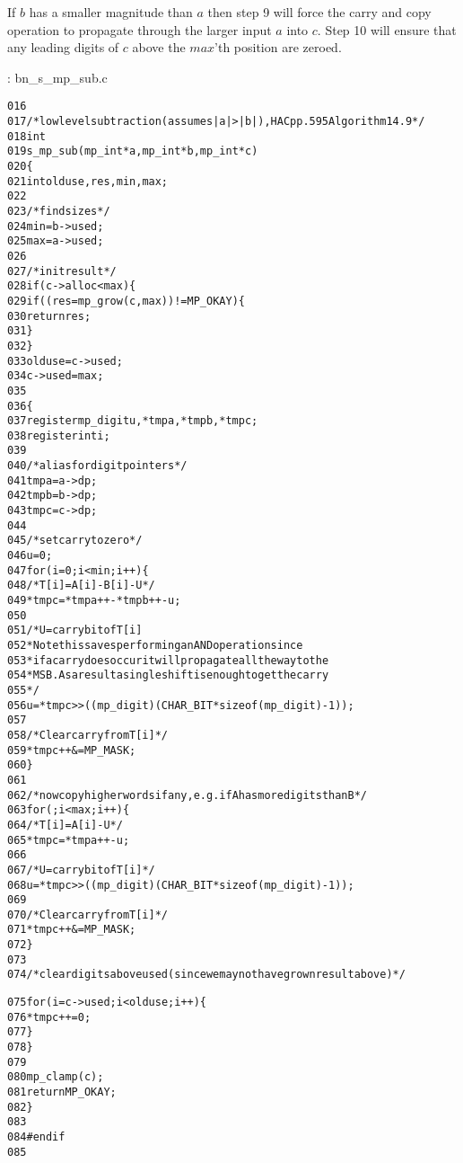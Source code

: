 \documentclass[b5paper]{book}
\begin{document}
If $b$ has a smaller magnitude than $a$ then step 9 will force the carry and copy operation to propagate through the larger input $a$ into $c$.  Step
10 will ensure that any leading digits of $c$ above the $max$'th position are zeroed.

\vspace{+3mm}\begin{small}
\hspace{-5.1mm}{\bf File}: bn\_s\_mp\_sub.c
\vspace{-3mm}
\begin{alltt}
016   
017   /* low level subtraction (assumes |a| > |b|), HAC pp.595 Algorithm 14.9 */
018   int
019   s_mp_sub (mp_int * a, mp_int * b, mp_int * c)
020   \{
021     int     olduse, res, min, max;
022   
023     /* find sizes */
024     min = b->used;
025     max = a->used;
026   
027     /* init result */
028     if (c->alloc < max) \{
029       if ((res = mp_grow (c, max)) != MP_OKAY) \{
030         return res;
031       \}
032     \}
033     olduse = c->used;
034     c->used = max;
035   
036     \{
037       register mp_digit u, *tmpa, *tmpb, *tmpc;
038       register int i;
039   
040       /* alias for digit pointers */
041       tmpa = a->dp;
042       tmpb = b->dp;
043       tmpc = c->dp;
044   
045       /* set carry to zero */
046       u = 0;
047       for (i = 0; i < min; i++) \{
048         /* T[i] = A[i] - B[i] - U */
049         *tmpc = *tmpa++ - *tmpb++ - u;
050   
051         /* U = carry bit of T[i]
052          * Note this saves performing an AND operation since
053          * if a carry does occur it will propagate all the way to the
054          * MSB.  As a result a single shift is enough to get the carry
055          */
056         u = *tmpc >> ((mp_digit)(CHAR_BIT * sizeof (mp_digit) - 1));
057   
058         /* Clear carry from T[i] */
059         *tmpc++ &= MP_MASK;
060       \}
061   
062       /* now copy higher words if any, e.g. if A has more digits than B  */
063       for (; i < max; i++) \{
064         /* T[i] = A[i] - U */
065         *tmpc = *tmpa++ - u;
066   
067         /* U = carry bit of T[i] */
068         u = *tmpc >> ((mp_digit)(CHAR_BIT * sizeof (mp_digit) - 1));
069   
070         /* Clear carry from T[i] */
071         *tmpc++ &= MP_MASK;
072       \}
073   
074       /* clear digits above used (since we may not have grown result above) */
      
075       for (i = c->used; i < olduse; i++) \{
076         *tmpc++ = 0;
077       \}
078     \}
079   
080     mp_clamp (c);
081     return MP_OKAY;
082   \}
083   
084   #endif
085   
\end{alltt}
\end{small}
\end{document}
